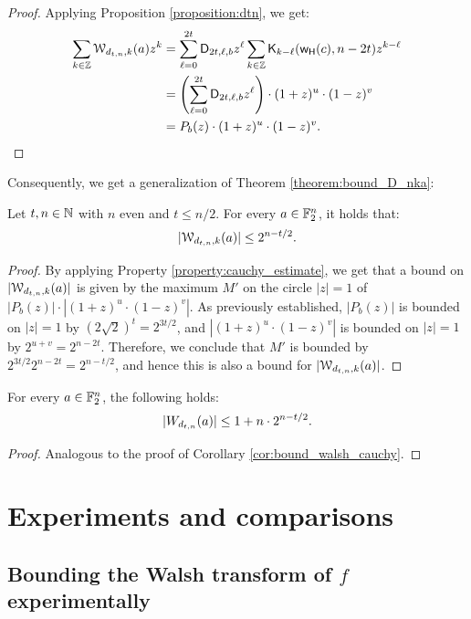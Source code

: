 \documentclass[11pt]{llncs}
\begin{document}
\begin{proof}
    Applying Proposition \ref{proposition:dtn}, we get:
    \begin{align*}
        \sum_{k\in\mathbb{Z}}\mathcal{W}_{d_{t,n},k}(a)z^k&=\sum_{\ell=0}^{2t}\mathsf{D}_{2t,\ell,b}z^\ell\sum_{k\in\mathbb{Z}}\mathsf{K}_{k-\ell}(\mathsf{w_H}(c),n-2t)z^{k-\ell}\\
        &=\left(\sum_{\ell=0}^{2t}\mathsf{D}_{2t,\ell,b}z^\ell\right)\cdot(1+z)^u\cdot(1-z)^v\\
        &=P_b(z)\cdot(1+z)^u\cdot(1-z)^v.\qedhere
    \end{align*}
\end{proof}

Consequently, we get a generalization of Theorem \ref{theorem:bound_D_nka}:

\begin{theorem}
    Let $t, n\in \mathbb{N}$ with $n$ even and $t\le n/2$. For every $a\in\mathbb{F}_2^n$, it holds that:
    \[
        |\mathcal{W}_{d_{t,n},k}(a)|\leq 2^{n-t/2}.
    \]
\end{theorem}

\begin{proof}
    By applying Property \ref{property:cauchy_estimate}, we get that a bound on $|\mathcal{W}_{d_{t,n},k}(a)|$ is given by the maximum $M'$ on the circle $|z|=1$ of $|P_b(z)|\cdot|(1+z)^u\cdot(1-z)^v|$. As previously established, $|P_b(z)|$ is bounded on $|z|=1$ by $(2\sqrt 2)^t=2^{3t/2}$, and $|(1+z)^u\cdot(1-z)^v|$ is bounded on $|z|=1$ by $2^{u+v}=2^{n-2t}$. Therefore, we conclude that $M'$ is bounded by $2^{3t/2}2^{n-2t}=2^{n-t/2}$, and hence this is also a bound for $|\mathcal{W}_{d_{t,n},k}(a)|$. 
\end{proof}

\begin{Corollary}
    For every $a\in\mathbb{F}_2^n$, the following holds:
    \[
        |W_{d_{t,n}}(a)|\leq 1+n\cdot 2^{n-t/2}.
    \]
\end{Corollary}

\begin{proof}
    Analogous to the proof of Corollary \ref{cor:bound_walsh_cauchy}.
\end{proof}

\section{Experiments and comparisons}



\subsection{Bounding the Walsh transform of $f$ experimentally}
\end{document}
